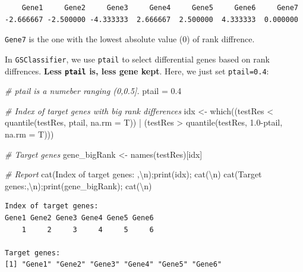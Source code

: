 \documentclass[
]{book}
\newenvironment{Shaded}{\begin{snugshade}}{\end{snugshade}}
\newcommand{\AttributeTok}[1]{\textcolor[rgb]{0.77,0.63,0.00}{#1}}
\newcommand{\CommentTok}[1]{\textcolor[rgb]{0.56,0.35,0.01}{\textit{#1}}}
\newcommand{\FloatTok}[1]{\textcolor[rgb]{0.00,0.00,0.81}{#1}}
\newcommand{\FunctionTok}[1]{\textcolor[rgb]{0.00,0.00,0.00}{#1}}
\newcommand{\NormalTok}[1]{#1}
\newcommand{\OtherTok}[1]{\textcolor[rgb]{0.56,0.35,0.01}{#1}}
\newcommand{\SpecialCharTok}[1]{\textcolor[rgb]{0.00,0.00,0.00}{#1}}
\newcommand{\StringTok}[1]{\textcolor[rgb]{0.31,0.60,0.02}{#1}}
\begin{document}
\begin{verbatim}
    Gene1     Gene2     Gene3     Gene4     Gene5     Gene6     Gene7 
-2.666667 -2.500000 -4.333333  2.666667  2.500000  4.333333  0.000000 
\end{verbatim}

\texttt{Gene7} is the one with the lowest absolute value (0) of rank diffrence.

In \texttt{GSClassifier}, we use \texttt{ptail} to select differential genes based on rank diffrences. \textbf{Less \texttt{ptail} is, less gene kept}. Here, we just set \texttt{ptail=0.4}:

\begin{Shaded}
\begin{Highlighting}[]
\CommentTok{\# ptail is a numeber ranging (0,0.5].}
\NormalTok{ptail }\OtherTok{=} \FloatTok{0.4}

\CommentTok{\# Index of target genes with big rank differences}
\NormalTok{idx }\OtherTok{\textless{}{-}} \FunctionTok{which}\NormalTok{((testRes }\SpecialCharTok{\textless{}} \FunctionTok{quantile}\NormalTok{(testRes, ptail, }\AttributeTok{na.rm =}\NormalTok{ T)) }\SpecialCharTok{|} 
\NormalTok{             (testRes }\SpecialCharTok{\textgreater{}} \FunctionTok{quantile}\NormalTok{(testRes, }\FloatTok{1.0}\SpecialCharTok{{-}}\NormalTok{ptail, }\AttributeTok{na.rm =}\NormalTok{ T)))}

\CommentTok{\# Target genes}
\NormalTok{gene\_bigRank }\OtherTok{\textless{}{-}} \FunctionTok{names}\NormalTok{(testRes)[idx]}

\CommentTok{\# Report}
\FunctionTok{cat}\NormalTok{(}\StringTok{\textquotesingle{}Index of target genes: \textquotesingle{}}\NormalTok{,}\StringTok{\textquotesingle{}}\SpecialCharTok{\textbackslash{}n}\StringTok{\textquotesingle{}}\NormalTok{);}\FunctionTok{print}\NormalTok{(idx); }\FunctionTok{cat}\NormalTok{(}\StringTok{\textquotesingle{}}\SpecialCharTok{\textbackslash{}n}\StringTok{\textquotesingle{}}\NormalTok{)}
\FunctionTok{cat}\NormalTok{(}\StringTok{\textquotesingle{}Target genes:\textquotesingle{}}\NormalTok{,}\StringTok{\textquotesingle{}}\SpecialCharTok{\textbackslash{}n}\StringTok{\textquotesingle{}}\NormalTok{);}\FunctionTok{print}\NormalTok{(gene\_bigRank); }\FunctionTok{cat}\NormalTok{(}\StringTok{\textquotesingle{}}\SpecialCharTok{\textbackslash{}n}\StringTok{\textquotesingle{}}\NormalTok{)}
\end{Highlighting}
\end{Shaded}

\begin{verbatim}
Index of target genes:  
Gene1 Gene2 Gene3 Gene4 Gene5 Gene6 
    1     2     3     4     5     6 

Target genes: 
[1] "Gene1" "Gene2" "Gene3" "Gene4" "Gene5" "Gene6"
\end{verbatim}
\end{document}
